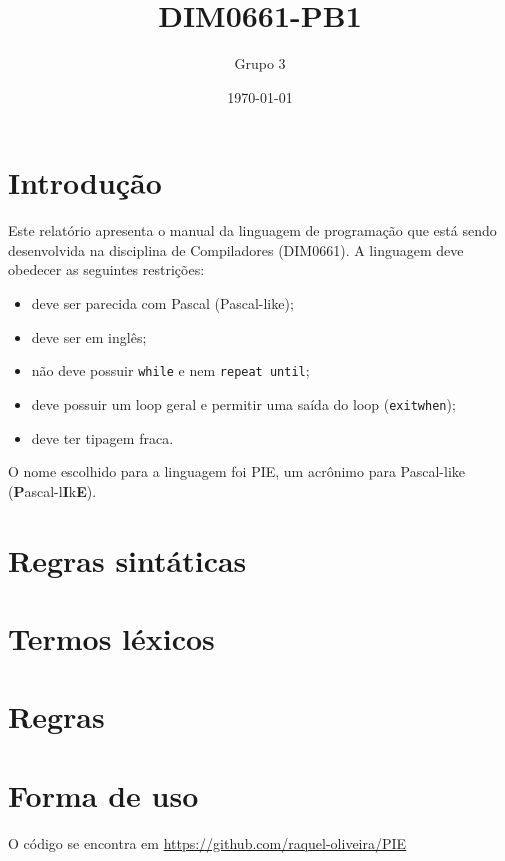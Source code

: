 \documentclass[12pt]{report}
\title{DIM0661-PB1}
\author{Grupo 3}
\date{\today}
\begin{document}
\maketitle

\tableofcontents

\chapter{Introdução}
Este relatório apresenta o manual da linguagem de programação que está sendo desenvolvida na disciplina de Compiladores (DIM0661). A linguagem deve obedecer as seguintes restrições:

\begin{changemargin}{1cm}{1cm}
\begin{itemize}
    \item deve ser parecida com Pascal (Pascal-like);
    \item deve ser em inglês;
    \item não deve possuir \texttt{while} e nem \texttt{repeat until};
    \item deve possuir um loop geral e permitir uma saída do loop (\texttt{exitwhen});
    \item deve ter tipagem fraca.
\end{itemize}
\end{changemargin}

O nome escolhido para a linguagem foi PIE, um acrônimo para Pascal-like (\textbf{P}ascal-l\textbf{I}k\textbf{E}).

\chapter{Regras sintáticas}


\newpage
\chapter{Termos léxicos}


\newpage
\chapter{Regras}


\newpage
\chapter{Forma de uso}
O código se encontra em \url{https://github.com/raquel-oliveira/PIE}
\end{document}
